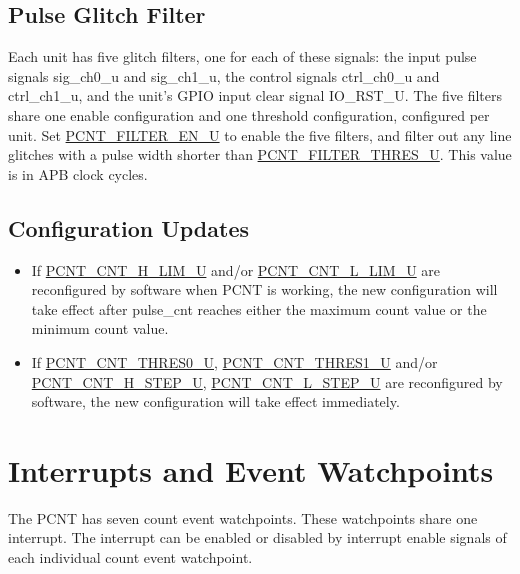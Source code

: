 \documentclass[main\_\_EN.tex]{subfiles}
\begin{document}
\subsection{Pulse Glitch Filter}

Each unit has five glitch filters, one for each of these signals: the input pulse signals sig\_ch0\_u and sig\_ch1\_u, the control signals ctrl\_ch0\_u and ctrl\_ch1\_u, and the unit's GPIO input clear signal IO\_RST\_U. The five filters share one enable configuration and one threshold configuration, configured per unit. Set \hyperref[fielddesc:PCNTFILTERENUN]{PCNT\_FILTER\_EN\_U} to enable the five filters, and filter out any line glitches with a pulse width shorter than \hyperref[fielddesc:PCNTFILTERTHRESUN]{PCNT\_FILTER\_THRES\_U}. This value is in APB clock cycles.

\subsection{Configuration Updates}

\begin{itemize}
\item If \hyperref[fielddesc:PCNTCNTHLIMUN]{PCNT\_CNT\_H\_LIM\_U} and/or \hyperref[fielddesc:PCNTCNTLLIMUN]{PCNT\_CNT\_L\_LIM\_U} are reconfigured by software when PCNT is working, the new configuration will take effect after pulse\_cnt reaches either the maximum count value or the minimum count value.
\item If \hyperref[fielddesc:PCNTCNTTHRES0UN]{PCNT\_CNT\_THRES0\_U}, \hyperref[fielddesc:PCNTCNTTHRES1UN]{PCNT\_CNT\_THRES1\_U} and/or \hyperref[fielddesc:PCNTCNTHSTEPUN]{PCNT\_CNT\_H\_STEP\_U}, \hyperref[fielddesc:PCNTCNTLSTEPUN]{PCNT\_CNT\_L\_STEP\_U} are reconfigured by software, the new configuration will take effect immediately.
\end{itemize}

\section{Interrupts and Event Watchpoints}

The PCNT has seven count event watchpoints. These watchpoints share one interrupt. The interrupt can be enabled or disabled by interrupt enable signals of each individual count event watchpoint.
\end{document}
